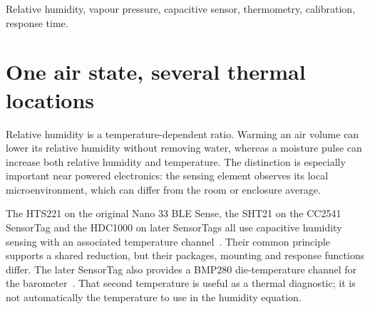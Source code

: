 \begin{abstract}
Relative humidity and temperature describe a coupled local air state. Interpreting either channel alone can confuse heating with a change in water-vapour content. Three independent capacitive-sensor examples illustrate the distinction. During HTS221 warming, mean relative humidity falls from 46.84 to 40.40\%, while paired-channel vapour pressure changes by only $-0.75\%$. SHT21 and HDC1000 moisture pulses instead raise vapour pressure from 12.24 to $17.24\unit{hPa}$ and from 12.38 to $20.56\unit{hPa}$. A second board-temperature channel in the HDC1000 apparatus records a different thermal trajectory. A common thermodynamic reduction therefore requires sensor-local temperature, explicit pairing and calibration over both environmental variables.
\end{abstract}
\begin{IEEEkeywords}
Relative humidity, vapour pressure, capacitive sensor, thermometry, calibration, response time.
\end{IEEEkeywords}

\section{One air state, several thermal locations}
Relative humidity is a temperature-dependent ratio. Warming an air volume can lower its relative humidity without removing water, whereas a moisture pulse can increase both relative humidity and temperature. The distinction is especially important near powered electronics: the sensing element observes its local microenvironment, which can differ from the room or enclosure average.

The HTS221 on the original Nano 33 BLE Sense, the SHT21 on the CC2541 SensorTag and the HDC1000 on later SensorTags all use capacitive humidity sensing with an associated temperature channel~\cite{hts221,sht21,hdc1000}. Their common principle supports a shared reduction, but their packages, mounting and response functions differ. The later SensorTag also provides a BMP280 die-temperature channel for the barometer~\cite{bmp280}. That second temperature is useful as a thermal diagnostic; it is not automatically the temperature to use in the humidity equation.

